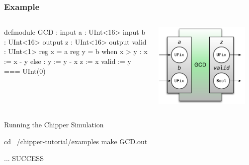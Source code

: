 \documentclass[xcolor=pdflatex,dvipsnames,table]{beamer}
\begin{document}
\begin{frame}[fragile]
\frametitle{Example}
\begin{columns}


\begin{footnotesize}
\begin{stanza}
defmodule GCD :
  input a      : UInt<16>
  input b      : UInt<16>
  output z     : UInt<16>
  output valid : UInt<1>
  reg x = a
  reg y = b
  when x > y :
    x := x - y
  else :
    y := y - x
  z     := x
  valid := y === UInt(0)
\end{stanza}
\end{footnotesize}


\begin{center}
\includegraphics[width=0.9\textwidth]{figs/gcd.pdf} 
\end{center}

\end{columns}
\end{frame}

\begin{frame}[fragile]{Running the Chipper Simulation}

\begin{bash}
cd ~/chipper-tutorial/examples
make GCD.out
\end{bash}

{
\begin{bash}
...
SUCCESS
\end{bash}
}

\end{frame}
\end{document}
